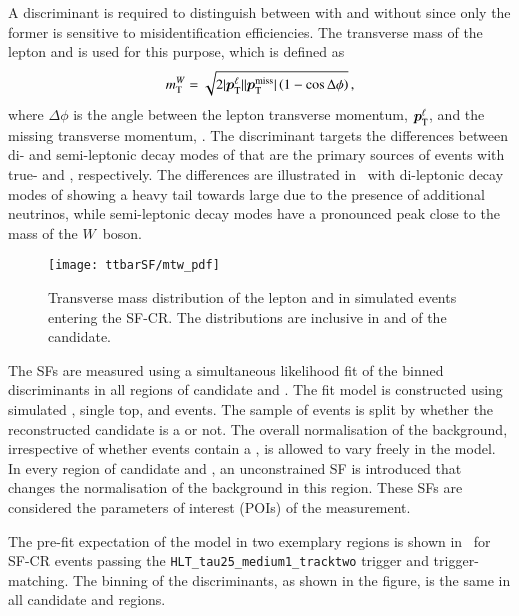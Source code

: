 A discriminant is required to distinguish between \ttbar with and without
\faketauhadvis since only the former is sensitive to \jettotauhadvis
misidentification efficiencies. The transverse mass of the lepton and \pTmissAbs
is used for this purpose, which is defined as
\begin{align*}
  m_{\text{T}}^W = \sqrt{2 | \bm{p}_{\text{T}}^{\ell} | | \bm{p}_{\text{T}}^{\text{miss}} | \left( 1 - \cos \Delta\phi \right)} \,\text{,}
\end{align*}
where $\Delta \phi$ is the angle between the lepton transverse momentum,
$\bm{p}_{\text{T}}^{\ell}$, and the missing transverse momentum, \pTmiss. The
\mTW discriminant targets the differences between di- and semi-leptonic decay
modes of \ttbar that are the primary sources of events with true- and
\faketauhadvis, respectively. The differences are illustrated
in~ with di-leptonic decay modes of \ttbar showing a
heavy tail towards large \mTW due to the presence of additional neutrinos, while
semi-leptonic decay modes have a pronounced peak close to the mass of the
$W$~boson.


\begin{figure}[htbp]
  \centering

  \texttt{[image: ttbarSF/mtw\_pdf]}

  \caption{Transverse mass distribution of the lepton and \pTmiss in simulated
    \ttbar events entering the SF-CR. The distributions are inclusive in \pT and
    \Ntracks of the \tauhadvis candidate.}%
  \label{fig:ttbarsf_mtw_pdf}
\end{figure}

The \faketauhadvis SFs are measured using a simultaneous likelihood fit of the
binned \mTW discriminants in all regions of \tauhadvis candidate \pT and
\Ntracks. The fit model is constructed using simulated \ttbar, single top, and
\Vjets events. The sample of \ttbar events is split by whether the
reconstructed \tauhadvis candidate is a \faketauhadvis or not. The overall
normalisation of the \ttbar background, irrespective of whether events contain a
\faketauhadvis, is allowed to vary freely in the model.  In every region of
\tauhadvis candidate \Ntracks and \pT, an unconstrained SF is introduced that
changes the normalisation of the \ttbarFakes background in this region. These
\faketauhadvis SFs are considered the parameters of interest (POIs) of the
measurement.

The pre-fit expectation of the model in two exemplary regions is shown
in~ for SF-CR events passing the
\verb|HLT_tau25_medium1_tracktwo| trigger and trigger-matching. The binning of
the \mTW discriminants, as shown in the figure, is the same in all \tauhadvis
candidate \pT and \Ntracks regions.

